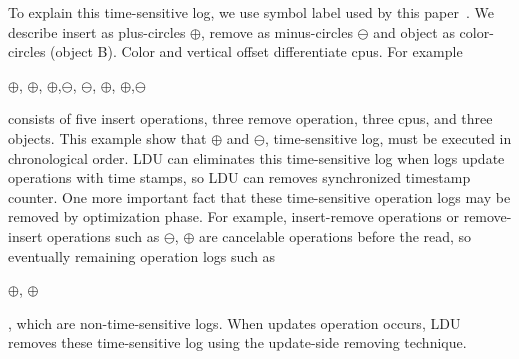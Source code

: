 To explain this time-sensitive log, we use symbol label used by this
paper~\cite{Clements15SCR}.
We describe insert as plus-circles $\oplus$, remove as minus-circles
$\ominus$ and object as color-circles (object B). 
Color and vertical offset differentiate cpus.
For example
\begin{center}
$\oplus$, $\oplus$, $\oplus$,$\ominus$,
$\ominus$, $\oplus$, $\oplus$,$\ominus$
\end{center}
consists of five insert operations, three remove operation, three cpus, and
three objects.
This example show that $\oplus$ and $\ominus$,
time-sensitive log, must be executed in chronological order.
LDU can eliminates this time-sensitive log when logs update operations with time
stamps, so LDU can removes synchronized timestamp counter.
One more important fact that these time-sensitive operation logs may be removed
by optimization phase.
For example, insert-remove operations or remove-insert operations such as 
$\ominus$, $\oplus$ are cancelable operations before
the read, so eventually remaining operation logs such as
\begin{center}
 $\oplus$, $\oplus$
\end{center}
, which are non-time-sensitive logs.
When updates operation occurs, LDU removes these time-sensitive log using
the update-side removing technique.
\fi


